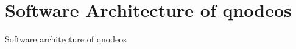\chapter{Software Architecture of \acrshort{qnodeos}}
\label{app:arch}

Software architecture of \acrshort{qnodeos}
